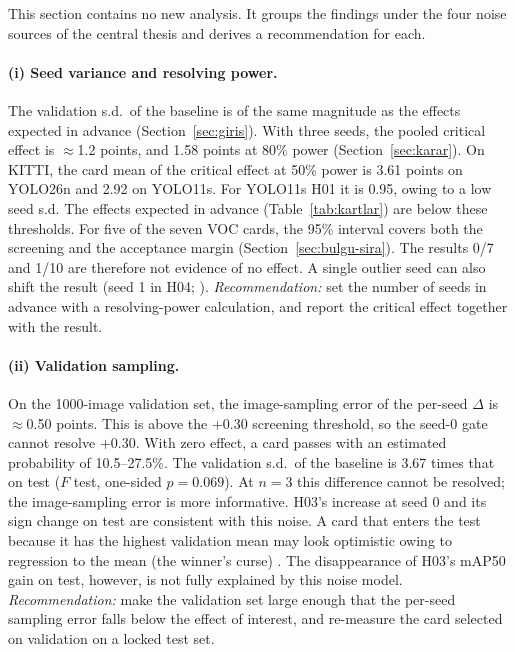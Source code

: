 \documentclass[pdflatex,iicol,sn-mathphys-num]{sn-jnl}
\begin{document}
This section contains no new analysis. It groups the findings under the four noise sources of the central thesis and derives a recommendation for each.

\paragraph{(i) Seed variance and resolving power.}
The validation s.d.\ of the baseline is of the same magnitude as the effects expected in advance (Section~\ref{sec:giris}). With three seeds, the pooled critical effect is $\approx$1.2 points, and 1.58 points at 80\% power (Section~\ref{sec:karar}). On KITTI, the card mean of the critical effect at 50\% power is 3.61 points on YOLO26n and 2.92 on YOLO11s. For YOLO11s H01 it is 0.95, owing to a low seed s.d. The effects expected in advance (Table~\ref{tab:kartlar}) are below these thresholds. For five of the seven VOC cards, the 95\% interval covers both the screening and the acceptance margin (Section~\ref{sec:bulgu-sira}). The results 0/7 and 1/10 are therefore not evidence of no effect. A single outlier seed can also shift the result (seed 1 in H04; \cite{picard_2021_seed}). \emph{Recommendation:} set the number of seeds in advance with a resolving-power calculation, and report the critical effect together with the result.

\paragraph{(ii) Validation sampling.}
On the 1000-image validation set, the image-sampling error of the per-seed $\Delta$ is $\approx$0.50 points. This is above the +0.30 screening threshold, so the seed-0 gate cannot resolve +0.30. With zero effect, a card passes with an estimated probability of 10.5--27.5\%. The validation s.d.\ of the baseline is 3.67 times that on test ($F$ test, one-sided $p=0.069$). At $n=3$ this difference cannot be resolved; the image-sampling error is more informative. H03's increase at seed 0 and its sign change on test are consistent with this noise. A card that enters the test because it has the highest validation mean may look optimistic owing to regression to the mean (the winner's curse) \cite{cawley_2010_overfitting,picard_2021_seed,bouthillier_2021_variance}. The disappearance of H03's mAP50 gain on test, however, is not fully explained by this noise model. \emph{Recommendation:} make the validation set large enough that the per-seed sampling error falls below the effect of interest, and re-measure the card selected on validation on a locked test set.
\end{document}
